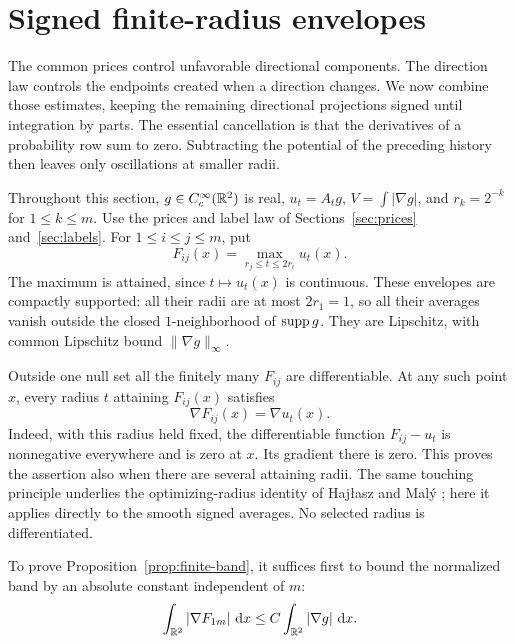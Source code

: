 \section{Signed finite-radius envelopes}\label{sec:assembly}

The common prices control unfavorable directional components. The
direction law controls the endpoints created when a direction changes.
We now combine those estimates, keeping the remaining directional
projections signed until integration by parts. The essential cancellation
is that the derivatives of a probability row sum to zero. Subtracting
the potential of the preceding history then leaves only oscillations
at smaller radii.

Throughout this section, $g\in C_c^\infty(\mathbb R^2)$ is real,
$u_t=A_tg$, $V=\int|\nabla g|$, and $r_k=2^{-k}$ for
$1\le k\le m$. Use the prices and label law of
Sections~\ref{sec:prices} and~\ref{sec:labels}. For $1\le i\le j\le m$,
put
\begin{equation}\label{eq:run-envelope}
 F_{ij}(x)=\max_{r_j\le t\le2r_i}u_t(x).
\end{equation}
The maximum is attained, since $t\mapsto u_t(x)$ is continuous.
These envelopes are compactly supported: all their radii are at most
$2r_1=1$, so all their averages vanish outside the closed
$1$-neighborhood of $\operatorname{supp} g$. They are Lipschitz, with common
Lipschitz bound $\|\nabla g\|_\infty$.

Outside one null set all the finitely many $F_{ij}$ are
differentiable. At any such point $x$, every radius $t$ attaining
$F_{ij}(x)$ satisfies
\begin{equation}\label{eq:envelope-touching}
 \nabla F_{ij}(x)=\nabla u_t(x).
\end{equation}
Indeed, with this radius held fixed, the differentiable function
$F_{ij}-u_t$ is nonnegative everywhere and is zero at $x$. Its
gradient there is zero. This proves the assertion also when there
are several attaining radii. The same touching principle underlies
the optimizing-radius identity of Haj{\l}asz and Mal\'y
\cite[Theorem~2 and Remark~3]{HajlaszMaly2010}; here it applies
directly to the smooth signed averages. No selected radius is
differentiated.

To prove Proposition~\ref{prop:finite-band}, it suffices first to
bound the normalized band by an absolute constant independent of $m$:
\begin{equation}\label{eq:finite-band}
 \int_{\mathbb R^2}|\nabla F_{1m}|\,\mathop{}\!\mathrm{d} x\le C\int_{\mathbb R^2}|\nabla g|\,\mathop{}\!\mathrm{d} x.
\end{equation}

